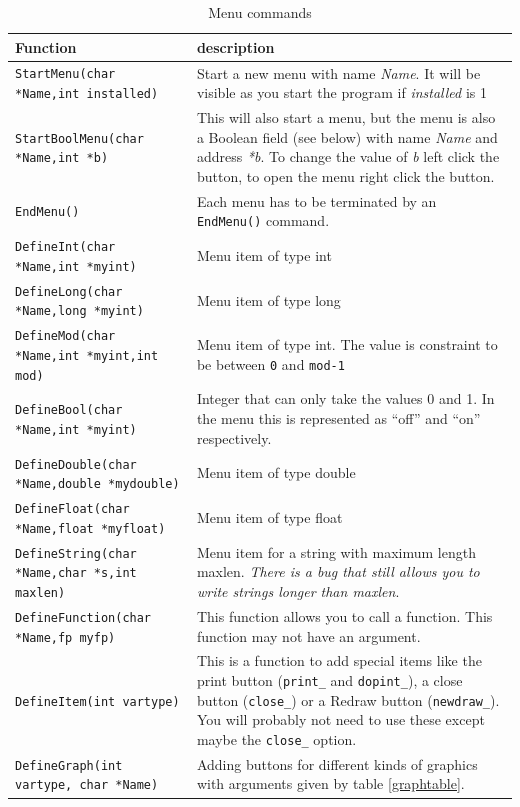 \documentclass[12pt,letterpaper]{article}
\begin{document}
\begin{table}
\begin{center}
\small
\begin{tabular}{|l|p{5cm}|}
\hline
Function & description\\
\hline
\texttt{StartMenu(char *Name,int installed)}& Start a new menu with
name \textit{Name}. It will be visible as you start the program if
\textit{installed} is 1 \\
\texttt{StartBoolMenu(char *Name,int *b)} & This will also start a
menu, but the menu is also a Boolean field (see below) with name
\textit{Name} and address \textit{*b}. To change the value of
\textit{b} left click the button, to open the menu right click the button.\\
\texttt{EndMenu()}&Each menu has to be terminated by an
\texttt{EndMenu()} command.\\
\hline
\texttt{DefineInt(char *Name,int *myint)}& Menu item of type int\\
\texttt{DefineLong(char *Name,long *myint)}& Menu item of type long \\
\texttt{DefineMod(char *Name,int *myint,int mod)}& Menu item of type
int. The value is constraint to be between \texttt{0} and \texttt{mod-1}\\
\texttt{DefineBool(char *Name,int *myint)}& Integer that can only take
the values 0 and 1. In the menu this is represented as ``off'' and ``on''
respectively. \\
\texttt{DefineDouble(char *Name,double *mydouble)}& Menu item of type double\\
\texttt{DefineFloat(char *Name,float *myfloat)}& Menu item of type float\\
\texttt{DefineString(char *Name,char *s,int maxlen)}&Menu item
for a string with maximum length maxlen. \textit{There is a bug that
  still allows you to write strings longer than maxlen}. \\
\hline
\texttt{DefineFunction(char *Name,fp myfp)}& This function allows you
to call a function. This function may not have an argument.\\ 
\texttt{DefineItem(int vartype)}& This is a function to add special
items like the print button (\texttt{print\_} and \texttt{dopint\_}),
a close button (\texttt{close\_}) or a Redraw button
(\texttt{newdraw\_}). You will probably not need to use these except
  maybe the \texttt{close\_} option.\\
\texttt{DefineGraph(int vartype, char *Name)}& Adding buttons for
different kinds of graphics with arguments given by table \ref{graphtable}.\\
\hline
\end{tabular}
\end{center}
\caption{Menu commands}
\end{table}
\end{document}
